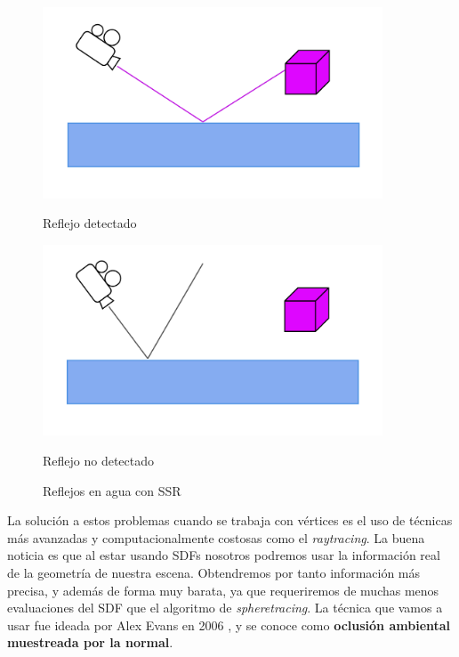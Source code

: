 \begin{figure}[!h]
     \begin{minipage}[c]{0.49\linewidth}
        \centering
        \includegraphics[width=0.9\textwidth]{Plantilla-TFG-master/img/ssr2.png}
        \caption{Reflejo detectado}
     \end{minipage}
     \begin{minipage}[c]{0.49\linewidth}
        \centering
        \includegraphics[width=0.9\textwidth]{Plantilla-TFG-master/img/ssr3.png}
        \caption{Reflejo no detectado}
     \end{minipage}
     \caption{Reflejos en agua con SSR}
     \label{fig:ssrEsquema}
\end{figure}

La solución a estos problemas cuando se trabaja con vértices es el uso de técnicas más avanzadas y computacionalmente costosas como el \textit{raytracing}. La buena noticia es que al estar usando SDFs nosotros podremos usar la información real de la geometría de nuestra escena. Obtendremos por tanto información más precisa, y además de forma muy barata, ya que requeriremos de muchas menos evaluaciones del SDF que el algoritmo de \textit{spheretracing}. La técnica que vamos a usar fue ideada por Alex Evans en 2006 \cite{ao}, y se conoce como \textbf{oclusión ambiental muestreada por la normal}.\newline

